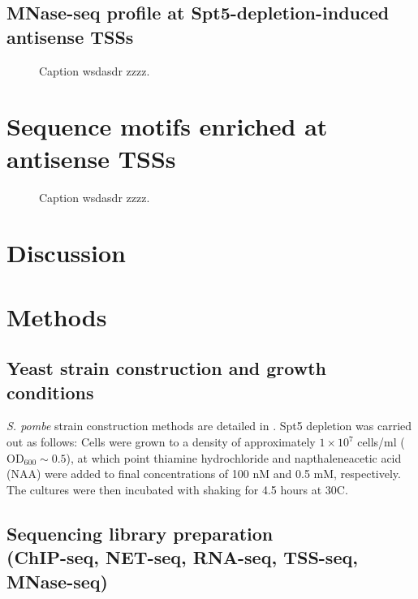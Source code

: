 \subsection{MNase-seq profile at Spt5-depletion-induced antisense TSSs}

\begin{figure}
\caption[A figure showing MNase-seq signal around Spt5-depletion-induced antisense TSSs.]{Caption wsdasdr zzzz.}
\end{figure}

\section{Sequence motifs enriched at antisense TSSs}

\begin{figure}
\caption[A figure showing motifs enriched upstream of Spt5-depletion-induced antisense TSSs.]{Caption wsdasdr zzzz.}
\end{figure}

\section{Discussion}

\section{Methods}

\subsection{Yeast strain construction and growth conditions}

\textit{S. pombe} strain construction methods are detailed in \citet{shetty2017}.
Spt5 depletion was carried out as follows: Cells were grown to a density of approximately $1 \times 10^7$ cells/ml ($\text{OD}_{600} \sim 0.5$), at which point thiamine hydrochloride and napthaleneacetic acid (NAA) were added to final concentrations of 100 nM and 0.5 mM, respectively.
The cultures were then incubated with shaking for 4.5 hours at 30\textdegree C.

\subsection{Sequencing library preparation\\(ChIP-seq, NET-seq, RNA-seq, TSS-seq, MNase-seq)}

